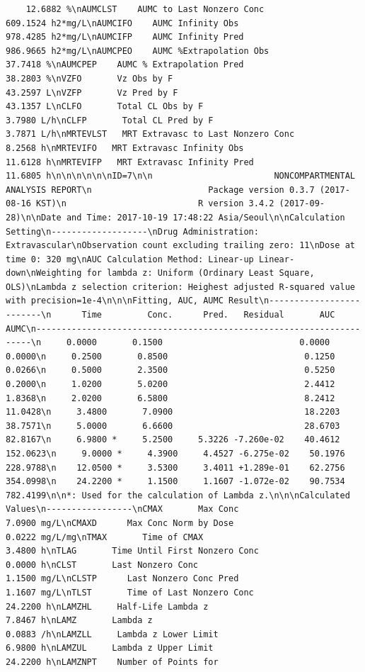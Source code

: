 \documentclass[]{krantz}
\theoremstyle{definition}
\theoremstyle{definition}
\theoremstyle{definition}
\theoremstyle{remark}
\begin{document}
\begin{verbatim}
    12.6882 %\nAUMCLST    AUMC to Last Nonzero Conc                     609.1524 h2*mg/L\nAUMCIFO    AUMC Infinity Obs                             978.4285 h2*mg/L\nAUMCIFP    AUMC Infinity Pred                            986.9665 h2*mg/L\nAUMCPEO    AUMC %Extrapolation Obs                        37.7418 %\nAUMCPEP    AUMC % Extrapolation Pred                      38.2803 %\nVZFO       Vz Obs by F                                    43.2597 L\nVZFP       Vz Pred by F                                   43.1357 L\nCLFO       Total CL Obs by F                               3.7980 L/h\nCLFP       Total CL Pred by F                              3.7871 L/h\nMRTEVLST   MRT Extravasc to Last Nonzero Conc              8.2568 h\nMRTEVIFO   MRT Extravasc Infinity Obs                     11.6128 h\nMRTEVIFP   MRT Extravasc Infinity Pred                    11.6805 h\n\n\n\n\n\nID=7\n\n                        NONCOMPARTMENTAL ANALYSIS REPORT\n                       Package version 0.3.7 (2017-08-16 KST)\n                          R version 3.4.2 (2017-09-28)\n\nDate and Time: 2017-10-19 17:48:22 Asia/Seoul\n\nCalculation Setting\n-------------------\nDrug Administration: Extravascular\nObservation count excluding trailing zero: 11\nDose at time 0: 320 mg\nAUC Calculation Method: Linear-up Linear-down\nWeighting for lambda z: Uniform (Ordinary Least Square, OLS)\nLambda z selection criterion: Heighest adjusted R-squared value with precision=1e-4\n\n\nFitting, AUC, AUMC Result\n-------------------------\n      Time         Conc.      Pred.   Residual       AUC       AUMC\n---------------------------------------------------------------------\n     0.0000       0.1500                           0.0000     0.0000\n     0.2500       0.8500                           0.1250     0.0266\n     0.5000       2.3500                           0.5250     0.2000\n     1.0200       5.0200                           2.4412     1.8368\n     2.0200       6.5800                           8.2412    11.0428\n     3.4800       7.0900                          18.2203    38.7571\n     5.0000       6.6600                          28.6703    82.8167\n     6.9800 *     5.2500     5.3226 -7.260e-02    40.4612   152.0623\n     9.0000 *     4.3900     4.4527 -6.275e-02    50.1976   228.9788\n    12.0500 *     3.5300     3.4011 +1.289e-01    62.2756   354.0998\n    24.2200 *     1.1500     1.1607 -1.072e-02    90.7534   782.4199\n\n*: Used for the calculation of Lambda z.\n\n\nCalculated Values\n-----------------\nCMAX       Max Conc                                        7.0900 mg/L\nCMAXD      Max Conc Norm by Dose                           0.0222 mg/L/mg\nTMAX       Time of CMAX                                    3.4800 h\nTLAG       Time Until First Nonzero Conc                   0.0000 h\nCLST       Last Nonzero Conc                               1.1500 mg/L\nCLSTP      Last Nonzero Conc Pred                          1.1607 mg/L\nTLST       Time of Last Nonzero Conc                      24.2200 h\nLAMZHL     Half-Life Lambda z                              7.8467 h\nLAMZ       Lambda z                                        0.0883 /h\nLAMZLL     Lambda z Lower Limit                            6.9800 h\nLAMZUL     Lambda z Upper Limit                           24.2200 h\nLAMZNPT    Number of Points for 
\end{verbatim}
\end{document}
